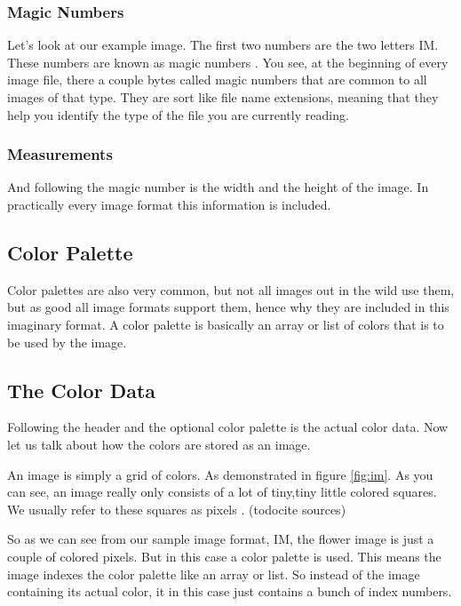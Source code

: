 \subsubsection{Magic Numbers}

Let's look at our example image. The first two numbers are the two
letters IM. These numbers are known as magic numbers . You see, at the beginning of every image file, there a
couple bytes called magic numbers that are common to all images of
that type. They are sort like file name extensions, meaning that they
help you identify the type of the file you are currently reading.

\subsubsection{Measurements}

And following the magic number is the width and the height of the
image. In practically every image format this information is
included.

\subsection{Color Palette}

Color palettes  are also very common, but not
all images out in the wild use them, but as good all image formats support
them, hence why they are included in this imaginary format. A color
palette is basically an array or list of colors that is to be used
by the image.

\subsection{The Color Data}

Following the header and the optional color palette is the actual
color data. Now let us talk about how the colors are stored as an
image.

An image is simply a grid of colors. As demonstrated in figure
\ref{fig:im}. As you can
see, an image really only consists of a lot of tiny,tiny little
colored squares. We usually refer to these squares as pixels
. (todo{cite sources})

So as we can see from our sample image format, IM, the flower image
is just a couple of colored pixels. But in this case a color palette
is used. This means the image indexes the color palette like an
array or list. So instead of the image containing its actual color,
it in this case just contains a bunch of index numbers.

